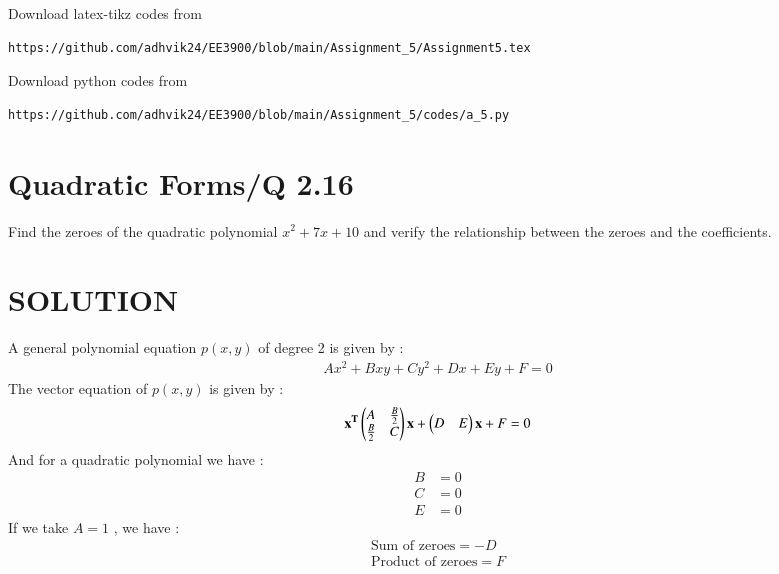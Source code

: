 \documentclass[journal,12pt,twocolumn]{IEEEtran}
\begin{document}
Download latex-tikz codes from 
%
\begin{lstlisting}
https://github.com/adhvik24/EE3900/blob/main/Assignment_5/Assignment5.tex
\end{lstlisting}
%
Download python codes from 
%
\begin{lstlisting}
https://github.com/adhvik24/EE3900/blob/main/Assignment_5/codes/a_5.py
\end{lstlisting}
\section{Quadratic Forms/Q 2.16}
Find the zeroes of the quadratic polynomial
$x^2+7x+10$ and verify the relationship between
the zeroes and the coefficients.
\section{SOLUTION}

\begin{lemma}
A general polynomial equation $p(x,y)$ of degree 2 is given by :
\begin{align}
Ax^2 + Bxy + Cy^2 + Dx + Ey + F = 0
\end{align}
The vector equation of $p(x,y)$ is given by :
\begin{align}
\mathbf{x^T}\begin{pmatrix}A & \frac{B}{2} \\ \frac{B}{2} & C\end{pmatrix}\mathbf{x} + \begin{pmatrix}D & E\end{pmatrix}\mathbf{x} + F=0\label{eq:1}
\end{align}
And for a quadratic polynomial we have :
\begin{align}
B &= 0\\
C &= 0\\
E &= 0
\end{align}
If we take $A = 1$ , we have :
\begin{align}
\text{Sum of zeroes} = -D \\
\text{Product of zeroes} = F 
\end{align}

\end{lemma}
\end{document}
